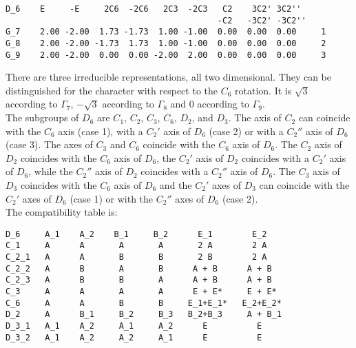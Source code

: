 \documentclass[12pt,a4paper,twoside]{report}
\begin{document}
\begin{tcolorbox}
\begin{footnotesize}
\begin{verbatim}
D_6    E     -E     2C6  -2C6   2C3  -2C3   C2    3C2' 3C2''
                                           -C2   -3C2' -3C2''
G_7    2.00 -2.00  1.73 -1.73  1.00 -1.00  0.00  0.00  0.00     1
G_8    2.00 -2.00 -1.73  1.73  1.00 -1.00  0.00  0.00  0.00     2
G_9    2.00 -2.00  0.00  0.00 -2.00  2.00  0.00  0.00  0.00     3
\end{verbatim}
\end{footnotesize}
\end{tcolorbox}

There are three irreducible representations, all two dimensional. 
They can be distinguished for the character with respect to the $C_6$ rotation.
It is $\sqrt{3}$ according to $\Gamma_7$, $-\sqrt{3}$ according to $\Gamma_8$ 
and $0$ according to $\Gamma_9$.\\
The subgroups of $D_6$ are $C_1$, $C_2$, $C_3$, $C_6$, $D_2$, and $D_3$. 
The axis of $C_2$ can coincide with the $C_6$ axis (case 1), with a $C_2'$ axis 
of $D_6$ (case 2) or with a $C_2''$ axis of $D_6$ (case 3). 
The axes of $C_3$ and $C_6$ coincide with the $C_6$ axis of $D_6$. 
The $C_2$ axis of $D_2$ coincides with the 
$C_6$ axis of $D_6$, the $C_2'$ axis of $D_2$ coincides with a $C_2'$ axis of $D_6$,
while the $C_2''$ axis of $D_2$ coincides with a $C_2''$ axis of $D_6$. 
The $C_3$ axis of $D_3$ coincides with the $C_6$ axis of $D_6$ and the $C_2'$ axes
of $D_3$ can coincide with the $C_2'$ axes of $D_6$ (case 1) or with the
$C_2''$ axes of $D_6$ (case 2).\\
The compatibility table is:

\begin{tcolorbox}
\begin{footnotesize}
\begin{verbatim}
D_6     A_1    A_2    B_1     B_2      E_1        E_2
C_1     A      A       A       A       2 A        2 A
C_2_1   A      A       B       B       2 B        2 A
C_2_2   A      B       A       B      A + B      A + B
C_2_3   A      B       B       A      A + B      A + B
C_3     A      A       A       A      E + E*     E + E*      
C_6     A      A       B       B     E_1+E_1*   E_2+E_2*   
D_2     A      B_1     B_2     B_3   B_2+B_3     A + B_1
D_3_1   A_1    A_2     A_1     A_2      E          E
D_3_2   A_1    A_2     A_2     A_1      E          E
\end{verbatim}
\end{footnotesize}
\end{tcolorbox}
\end{document}
